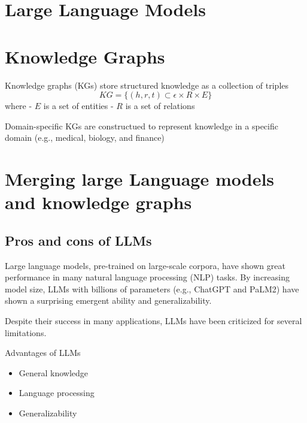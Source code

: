 \documentclass[11pt, reqno]{amsart}
\theoremstyle{definition}
\theoremstyle{remark}
\begin{document}
  \section{Large Language Models}

  \section{Knowledge Graphs}

  Knowledge graphs (KGs) store structured knowledge as a collection of triples
  \[
    KG = \{(h, r, t) \subset \epsilon \times R \times E\}
  \]
  where - $E$ is a set of entities - $R$ is a set of relations

  Domain-specific KGs are constructued to represent knowledge in a specific
  domain (e.g., medical, biology, and finance)


  \section{Merging large Language models and knowledge graphs}

  \subsection{Pros and cons of LLMs}

  Large language models, pre-trained on large-scale corpora, have shown great
  performance in many natural language processing (NLP) tasks. By increasing model
  size, LLMs with billions of parameters (e.g., ChatGPT and PaLM2) have shown a
  surprising emergent ability and generalizability.

  Despite their success in many applications, LLMs have been criticized for several
  limitations.

  Advantages of LLMs

  \begin{itemize}
    \item General knowledge

    \item Language processing

    \item Generalizability
  \end{itemize}
\end{document}
